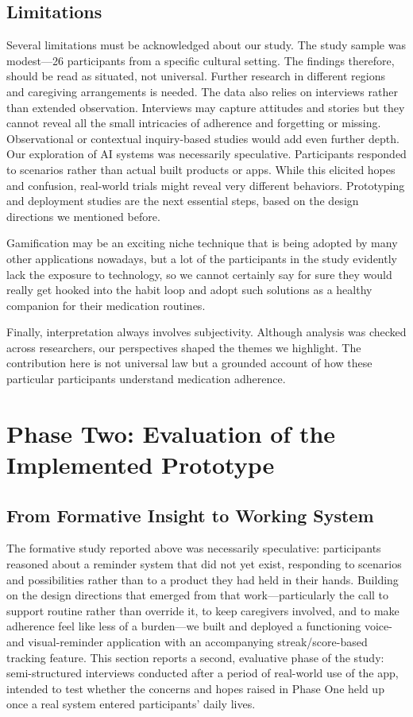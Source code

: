 \documentclass[acmlarge]{acmart}
\begin{document}
\subsection{Limitations}
Several limitations must be acknowledged about our study. The study
sample was modest---26 participants from a specific cultural setting.
The findings therefore, should be read as situated, not universal.
Further research in different regions and caregiving arrangements is
needed. The data also relies on interviews rather than extended
observation. Interviews may capture attitudes and stories but they
cannot reveal all the small intricacies of adherence and forgetting or
missing. Observational or contextual inquiry-based studies would add
even further depth. Our exploration of AI systems was necessarily
speculative. Participants responded to scenarios rather than actual
built products or apps. While this elicited hopes and confusion,
real-world trials might reveal very different behaviors. Prototyping and
deployment studies are the next essential steps, based on the design
directions we mentioned before.

Gamification may be an exciting niche technique that is being adopted by
many other applications nowadays, but a lot of the participants in the
study evidently lack the exposure to technology, so we cannot certainly
say for sure they would really get hooked into the habit loop and adopt
such solutions as a healthy companion for their medication routines.

Finally, interpretation always involves subjectivity. Although analysis
was checked across researchers, our perspectives shaped the themes we
highlight. The contribution here is not universal law but a grounded
account of how these particular participants understand medication
adherence.

\section{Phase Two: Evaluation of the Implemented Prototype}

\subsection{From Formative Insight to Working System}
The formative study reported above was necessarily speculative: participants
reasoned about a reminder system that did not yet exist, responding to
scenarios and possibilities rather than to a product they had held in their
hands. Building on the design directions that emerged from that
work---particularly the call to support routine rather than override it, to
keep caregivers involved, and to make adherence feel like less of a
burden---we built and deployed a functioning voice- and visual-reminder
application with an accompanying streak/score-based tracking feature. This
section reports a second, evaluative phase of the study: semi-structured
interviews conducted after a period of real-world use of the app, intended to
test whether the concerns and hopes raised in Phase One held up once a real
system entered participants' daily lives.
\end{document}
